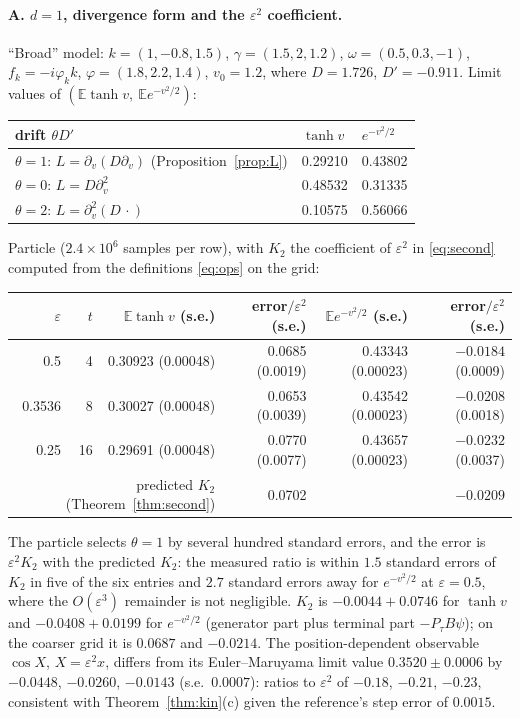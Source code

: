 \documentclass[11pt]{article}
\newcommand{\E}{\mathbb{E}}
\newcommand{\eps}{\varepsilon}
\theoremstyle{remark}
\begin{document}
\paragraph{A. $d=1$, divergence form and the $\eps^2$ coefficient.}
``Broad'' model: $k=(1,-0.8,1.5)$, $\gamma=(1.5,2,1.2)$,
$\omega=(0.5,0.3,-1)$, $f_k=-i\varphi_kk$, $\varphi=(1.8,2.2,1.4)$,
$v_0=1.2$, where $D=1.726$, $D'=-0.911$. Limit values of
$(\E\tanh v,\ \E e^{-v^2/2})$:
\begin{center}
\begin{tabular}{lll}
  drift $\theta D'$ & $\tanh v$ & $e^{-v^2/2}$ \\ \hline
  $\theta=1$: $L=\partial_v(D\partial_v)$ (Proposition~\ref{prop:L}) & 0.29210 & 0.43802 \\
  $\theta=0$: $L=D\partial_v^2$ & 0.48532 & 0.31335 \\
  $\theta=2$: $L=\partial_v^2(D\,\cdot)$ & 0.10575 & 0.56066 \\
\end{tabular}
\end{center}
Particle ($2.4\times10^6$ samples per row), with $K_2$ the coefficient of
$\eps^2$ in \eqref{eq:second} computed from the definitions \eqref{eq:ops}
on the grid:
\begin{center}
\begin{tabular}{rrrrrr}
  $\eps$ & $t$ & $\E\tanh v$ (s.e.) & error$/\eps^2$ (s.e.) &
  $\E e^{-v^2/2}$ (s.e.) & error$/\eps^2$ (s.e.) \\ \hline
  0.5 & 4 & 0.30923 (0.00048) & 0.0685 (0.0019) & 0.43343 (0.00023) & $-0.0184$ (0.0009) \\
  0.3536 & 8 & 0.30027 (0.00048) & 0.0653 (0.0039) & 0.43542 (0.00023) & $-0.0208$ (0.0018) \\
  0.25 & 16 & 0.29691 (0.00048) & 0.0770 (0.0077) & 0.43657 (0.00023) & $-0.0232$ (0.0037) \\ \hline
  \multicolumn{3}{r}{predicted $K_2$ (Theorem~\ref{thm:second})} & 0.0702 & & $-0.0209$ \\
\end{tabular}
\end{center}
The particle selects $\theta=1$ by several hundred standard errors, and the
error is $\eps^2K_2$ with the predicted $K_2$: the measured ratio is within
$1.5$ standard errors of $K_2$ in five of the six entries and $2.7$ standard
errors away for $e^{-v^2/2}$ at $\eps=0.5$, where the $O(\eps^3)$ remainder
is not negligible. $K_2$ is $-0.0044+0.0746$ for $\tanh v$ and
$-0.0408+0.0199$ for $e^{-v^2/2}$ (generator part plus terminal part
$-P_\tau B\psi$); on the coarser grid it is $0.0687$ and $-0.0214$. The
position-dependent observable $\cos X$, $X=\eps^2x$, differs from its
Euler--Maruyama limit value $0.3520\pm0.0006$ by $-0.0448$, $-0.0260$,
$-0.0143$ (s.e.\ $0.0007$): ratios to $\eps^2$ of $-0.18$, $-0.21$,
$-0.23$, consistent with Theorem~\ref{thm:kin}(c) given the reference's
step error of $0.0015$.
\end{document}
